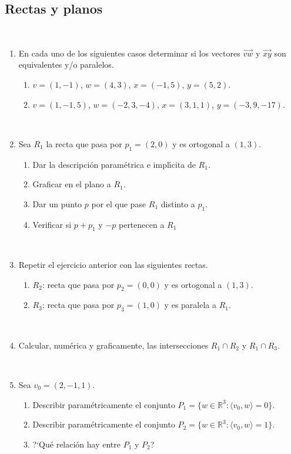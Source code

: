 \documentclass[12pt]{amsart}
\begin{document}
\subsection*{Rectas y planos}

\


\begin{enumerate}[resume]

\item En  cada uno de los siguientes casos determinar si los
vectores  $\overrightarrow{vw}$ y $\overrightarrow{xy}$ son
equivalentes y/o paralelos.
\begin{enumerate}
\item   $v=(1,-1)$,  $w=(4,3)$, $x=(-1,5)$, $y=(5,2)$.
\item   $v=(1,-1,5)$,  $w=(-2,3,-4)$,  $x=(3,1,1)$,  $y=(-3,9,-17)$.
\end{enumerate}

\

\item Sea $R_1$ la recta que pasa por $p_1=(2,0)$ y es ortogonal a $(1,3)$.
\begin{enumerate}
 \item Dar la descripci\'on param{\'e}trica e impl{\'\i}cita de $R_1$.
 \item Graficar en el plano a $R_1$.
 \item Dar un punto $p$ por el que pase $R_1$ distinto a $p_1$.
 \item Verificar si $p+p_1$ y $-p$ pertenecen a $R_1$
\end{enumerate}

\

\item Repetir el ejercicio anterior con las siguientes rectas.
\begin{enumerate}
	\item
	$R_2$: recta que pasa por $p_2=(0,0)$ y es ortogonal a $(1,3)$.
	\item
	$R_3$: recta que pasa por $p_3=(1,0)$ y es paralela a $R_1$.
\end{enumerate}

\

\item Calcular, num\'erica y graficamente, las intersecciones $R_1\cap R_2$ y $R_1\cap R_3$.

\

\item Sea $v_0=(2,-1,1)$.
\begin{enumerate}
	\item Describir param{\'e}tricamente el conjunto
	$P_1=\{w\in\mathbb{ R}^3:\langle v_0 , w  \rangle=0\}$.
	\item Describir param{\'e}tricamente el conjunto
	$P_2=\{w\in\mathbb{ R}^3:\langle v_0 , w  \rangle=1\}$.
	\item ?`Qu\'e relaci\'on hay entre $P_1$ y $P_2$?
\end{enumerate}


\end{enumerate}
\end{document}

